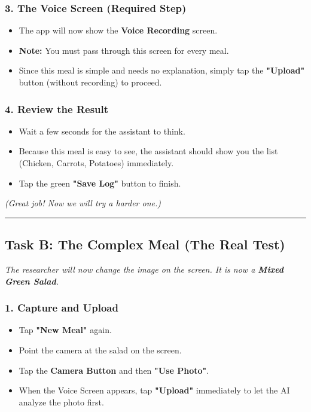 \subsubsection*{3. The Voice Screen (Required Step)}

\begin{itemize}
    \item The app will now show the \textbf{Voice Recording} screen.
    \item \textbf{Note:} You must pass through this screen for every meal.
    \item Since this meal is simple and needs no explanation, simply tap the \textbf{"Upload"} button (without recording) to proceed.
\end{itemize}

\subsubsection*{4. Review the Result}

\begin{itemize}
    \item Wait a few seconds for the assistant to think.
    \item Because this meal is easy to see, the assistant should show you the list (Chicken, Carrots, Potatoes) immediately.
    \item Tap the green \textbf{"Save Log"} button to finish.
\end{itemize}

\textit{(Great job! Now we will try a harder one.)}

\vspace{1em}
\hrule
\vspace{1em}

\subsection*{Task B: The Complex Meal (The Real Test)}

\textit{The researcher will now change the image on the screen. It is now a \textbf{Mixed Green Salad}.}

\subsubsection*{1. Capture and Upload}

\begin{itemize}
    \item Tap \textbf{"New Meal"} again.
    \item Point the camera at the salad on the screen.
    \item Tap the \textbf{Camera Button} and then \textbf{"Use Photo"}.
    \item When the Voice Screen appears, tap \textbf{"Upload"} immediately to let the AI analyze the photo first.
\end{itemize}

